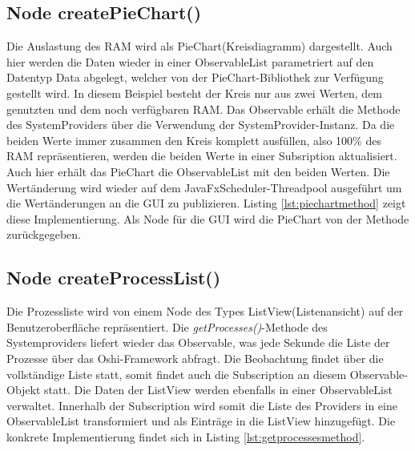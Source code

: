 \subsection{Node createPieChart()}
 
Die Auslastung des RAM wird als PieChart(Kreisdiagramm) dargestellt. Auch hier werden die Daten wieder in einer ObservableList parametriert auf den Datentyp Data abgelegt, welcher von der PieChart-Bibliothek zur Verfügung gestellt wird. In diesem Beispiel besteht der Kreis nur aus zwei Werten, dem genutzten und dem noch verfügbaren RAM. Das Observable erhält die Methode des SystemProviders über die Verwendung der SystemProvider-Instanz. Da die beiden Werte immer zusammen den Kreis komplett ausfüllen, also 100\% des RAM repräsentieren, werden die beiden Werte in einer Subsription aktualisiert. Auch hier erhält das PieChart die ObservableList mit den beiden Werten. Die Wertänderung wird wieder auf dem JavaFxScheduler-Threadpool ausgeführt um die Wertänderungen an die GUI zu publizieren. Listing \ref{lst:piechartmethod} zeigt diese Implementierung. Als Node für die GUI wird die PieChart von der Methode zurückgegeben.
\subsection{Node createProcessList()}

Die Prozessliste wird von einem Node des Types ListView(Listenansicht) auf der Benutzeroberfläche repräsentiert. Die \textit{getProcesses()}-Methode des Systemproviders liefert wieder das Observable, was jede Sekunde die Liste der Prozesse über das Oshi-Framework abfragt. Die Beobachtung findet über die vollständige Liste statt, somit findet auch die Subscription an diesem Observable-Objekt statt. Die Daten der ListView werden ebenfalls in einer ObservableList verwaltet. Innerhalb der Subscription wird somit die Liste des Providers in eine ObservableList transformiert und als Einträge in die ListView hinzugefügt. 
Die konkrete Implementierung findet sich in Listing \ref{lst:getprocessesmethod}.
